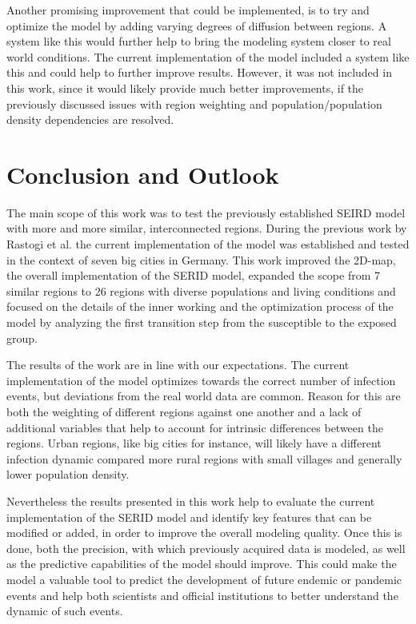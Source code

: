 Another promising improvement that could be implemented, is to try and optimize the model by adding varying degrees of
diffusion between regions. A system like this would further help to bring the modeling system closer to real world conditions. The current
implementation of the model included a system like this and could help to further improve results. However, it was not included
in this work, since it would likely provide much better improvements, if the previously discussed issues with region weighting
and population/population density dependencies are resolved.


\section{Conclusion and Outlook}
The main scope of this work was to test the previously established SEIRD model with more and more similar, interconnected regions.
During the previous work by Rastogi et al.\cite{Rastogi} the current implementation of the model was established and tested in the
context of seven big cities in Germany. This work improved the 2D-map, the overall implementation of the SERID model, expanded
the scope from 7 similar regions to 26 regions with diverse populations and living conditions and focused on the
details of the inner working and the optimization process of the model by analyzing the first transition step from the susceptible
to the exposed group.\newline

The results of the work are in line with our expectations. The current implementation
of the model optimizes towards the correct number of infection events, but deviations from the real world data are common. Reason for
this are both the weighting of different regions against one another and a lack of additional variables that help to account for
intrinsic differences between the regions. Urban regions, like big cities for instance, will likely have a different infection dynamic
compared more rural  regions with small villages and generally lower population density.\newline

Nevertheless the results presented in this work help to evaluate the current implementation of the SERID model and identify
key features that can be modified or added, in order to improve the overall modeling quality. Once this is done, both the precision, with
which previously acquired data is modeled, as well as the predictive capabilities of the model should improve. This could make
the model a valuable tool to predict the development of future endemic or pandemic events and help both scientists and official
institutions to better understand the dynamic of such events.




